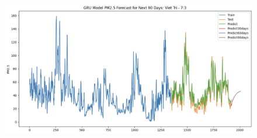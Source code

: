 \begin{figure}[H]
        \hfill
        \begin{minipage}{0.15\textwidth}
        \centering
        \includegraphics[width=1\textwidth, height=0.7\textwidth]{img/final/GRU/90D/GRU_7_3_VT.png}
        \end{minipage}
        \hfill


\end{figure}
